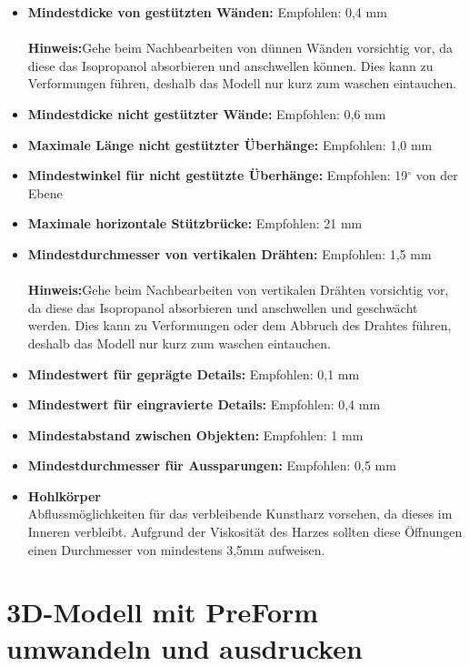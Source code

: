 \documentclass{\basedir/fablab-document}
\begin{document}
	\begin{itemize}
	\item \textbf{Mindestdicke von gestützten Wänden:}  Empfohlen: 0,4 mm\\
	\\
	\textbf{Hinweis:}Gehe beim Nachbearbeiten von dünnen Wänden vorsichtig vor, da diese das Isopropanol absorbieren und anschwellen können. Dies kann zu Verformungen führen, deshalb das Modell nur kurz zum waschen eintauchen. \\
	\item \textbf{Mindestdicke nicht gestützter Wände:}  Empfohlen: 0,6 mm
	\item \textbf{Maximale Länge nicht gestützter Überhänge:}  Empfohlen: 1,0 mm
	\item \textbf{Mindestwinkel für nicht gestützte Überhänge:}  Empfohlen: 19$^\circ$ von der Ebene
	\item \textbf{Maximale horizontale Stützbrücke:}  Empfohlen: 21 mm
	\item \textbf{Mindestdurchmesser von vertikalen Drähten:}  Empfohlen: 1,5 mm \\
	\\
	\textbf{Hinweis:}Gehe beim Nachbearbeiten von vertikalen Drähten vorsichtig vor, da diese das Isopropanol absorbieren und anschwellen und geschwächt werden. Dies kann zu Verformungen oder dem Abbruch des Drahtes führen, deshalb das Modell nur kurz zum waschen eintauchen. \\
	\item \textbf{Mindestwert für geprägte Details:}  Empfohlen: 0,1 mm
	\item \textbf{Mindestwert für eingravierte Details:}  Empfohlen: 0,4 mm
	\item \textbf{Mindestabstand zwischen Objekten:}  Empfohlen: 1 mm
	\item \textbf{Mindestdurchmesser für Aussparungen:}  Empfohlen: 0,5 mm
	\item \textbf{Hohlkörper} \\
	Abflussmöglichkeiten für das verbleibende Kunstharz vorsehen, da dieses im Inneren verbleibt. Aufgrund der Viskosität des Harzes sollten diese Öffnungen einen Durchmesser von mindestens 3,5mm aufweisen.
	
\end{itemize}


	\newpage
	
	\section{3D-Modell mit PreForm umwandeln und ausdrucken}
 
\end{document}
